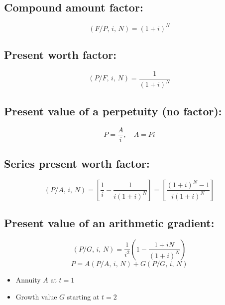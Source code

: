 \subsection{Compound amount factor:}
\begin{definition}
    \begin{equation}
        \left(F/P, \, i, \, N\right) = (1+i)^N
    \end{equation}
\end{definition}

\subsection{Present worth factor:}
\begin{definition}
    \begin{equation}
        \left(P/F, \, i, \, N\right) = \frac{1}{(1+i)^N}
    \end{equation}            
\end{definition}

\subsection{Present value of a perpetuity (no factor):}
\begin{definition}
    \begin{equation}
        P = \frac{A}{i}, \quad A = Pi
    \end{equation}
\end{definition}

\subsection{Series present worth factor:}
\begin{definition}
    \begin{equation}
        \left(P/A, \, i, \, N\right) = \left[\frac{1}{i} - \frac{1}{i(1+i)^N}\right] = \left[\frac{(1+i)^N - 1}{i(1+i)^N}\right]
    \end{equation}
\end{definition}

\subsection{Present value of an arithmetic gradient:}
\begin{definition}
    \begin{equation}
        \left(P/G, \, i, \, N\right) = \frac{1}{i^2} \left(1 - \frac{1 + iN}{(1+i)^N}\right)
    \end{equation}
    \begin{equation}
        P = A \left(P/A, \, i, \, N\right) + G \left(P/G, \, i, \, N\right)
    \end{equation}
    \begin{itemize}
        \item Annuity $A$ at $t=1$
        \item Growth value $G$ starting at $t=2$
    \end{itemize}
\end{definition}

